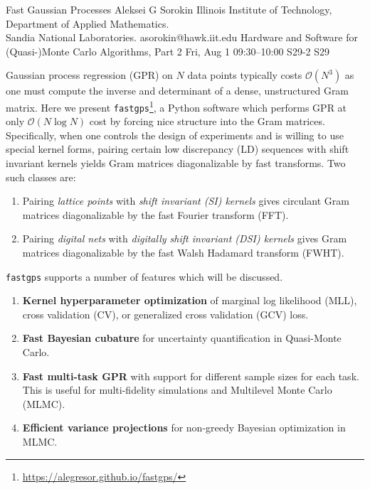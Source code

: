 \begin{talk}
  {Fast Gaussian Processes}%
  {Aleksei G Sorokin}%
  {Illinois Institute of Technology, Department of Applied Mathematics. \\ Sandia National Laboratories.}%
  {asorokin@hawk.iit.edu}%
  {}%
  {Hardware and Software for (Quasi-)Monte Carlo Algorithms, Part 2}%
  {Fri, Aug 1 09:30--10:00}%
  {S29-2}%
  {S29}%
    

        Gaussian process regression (GPR) on $N$ data points typically costs $\mathcal{O}(N^3)$ as one must compute the inverse and determinant of a dense, unstructured Gram matrix. Here we present \texttt{fastgps}\footnote{\url{https://alegresor.github.io/fastgps/}}, a Python software which performs GPR at only $\mathcal{O}(N \log N)$ cost by forcing nice structure into the Gram matrices. Specifically, when one controls the design of experiments and is willing to use special kernel forms, pairing certain low discrepancy (LD) sequences with shift invariant kernels yields Gram matrices diagonalizable by fast transforms. Two such classes are:
        \begin{enumerate}
          \item Pairing \emph{lattice points} with \emph{shift invariant (SI) kernels} gives circulant Gram matrices diagonalizable by the fast Fourier transform (FFT). 
          \item Pairing \emph{digital nets} with \emph{digitally shift invariant (DSI) kernels} gives Gram matrices diagonalizable by the fast Walsh Hadamard transform (FWHT). 
        \end{enumerate}
        \texttt{fastgps} supports a number of features which will be discussed. 
        \begin{enumerate}
          \item \textbf{Kernel hyperparameter optimization} of marginal log likelihood (MLL), cross validation (CV), or generalized cross validation (GCV) loss.
          \item \textbf{Fast Bayesian cubature} for uncertainty quantification in Quasi-Monte Carlo. 
          \item \textbf{Fast multi-task GPR} with support for different sample sizes for each task. This is useful for multi-fidelity simulations and Multilevel Monte Carlo (MLMC). 
          \item \textbf{Efficient variance projections} for non-greedy Bayesian optimization in MLMC.

\end{enumerate}
\end{talk}
